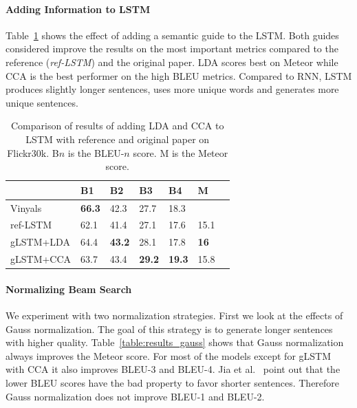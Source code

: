 \documentclass[twoside,twocolumn]{article}
\begin{document}
	\paragraph{Adding Information to LSTM}
	Table~\ref{table:results_lstm} shows the effect of adding a semantic guide to the LSTM. Both guides considered improve the results on the most important metrics compared to the reference (\emph{ref-LSTM}) and the original paper. LDA scores best on Meteor while CCA is the best performer on the high BLEU metrics. Compared to RNN, LSTM produces slightly longer sentences, uses more unique words and generates more unique sentences.
	\begin{table}
		\centering
		\begin{tabular}{lllllll}
			& B1 & B2 & B3 & B4 & M \\ \hline
			Vinyals~\cite{Google}      & \textbf{66.3}   & 42.3   & 27.7   & 18.3   & ~     \\ 
			ref-LSTM         & 62.1   & 41.4   & 27.1   & 17.6   & 15.1  \\
			gLSTM+LDA         & 64.4   & \textbf{43.2}   & 28.1   & 17.8   & \textbf{16}  \\
			gLSTM+CCA         & 63.7   & 43.4   & \textbf{29.2}   &\textbf{19.3}   & 15.8  \\ \hline
		\end{tabular}
		\caption{Comparison of results of adding LDA and CCA to LSTM with reference and original paper on Flickr30k. B$n$ is the BLEU-$n$ score. M is the Meteor score.}
		\label{table:results_lstm}
	\end{table}
	
	
	\paragraph{Normalizing Beam Search}
	We experiment with two normalization strategies. First we look at the effects of Gauss normalization. The goal of this strategy is to generate longer sentences with higher quality. Table~\ref{table:results_gauss} shows that Gauss normalization always improves the Meteor score. For most of the models except for gLSTM with CCA it also improves BLEU-3 and BLEU-4. Jia et al.~\cite{Jia2014} point out that the lower BLEU scores have the bad property to favor shorter sentences. Therefore Gauss normalization does not improve BLEU-1 and BLEU-2.
	
\end{document}
